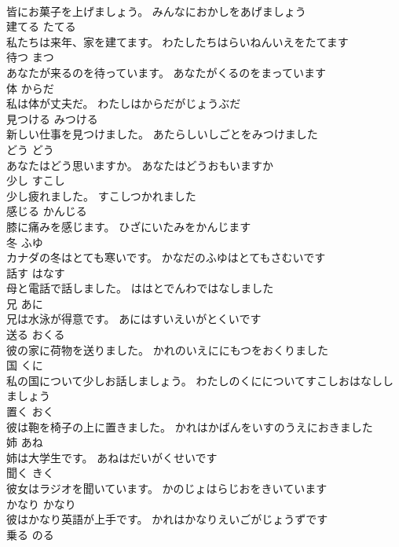 \documentclass[8pt]{extreport}
\begin{document}
\begin{CJK}{UTF8}{min}
\\	皆にお菓子を上げましょう。	みんなにおかしをあげましょう	
\\	建てる	たてる	
\\	私たちは来年、家を建てます。	わたしたちはらいねんいえをたてます	
\\	待つ	まつ	
\\	あなたが来るのを待っています。	あなたがくるのをまっています	
\\	体	からだ	
\\	私は体が丈夫だ。	わたしはからだがじょうぶだ	
\\	見つける	みつける	
\\	新しい仕事を見つけました。	あたらしいしごとをみつけました	
\\	どう	どう	
\\	あなたはどう思いますか。	あなたはどうおもいますか	
\\	少し	すこし	
\\	少し疲れました。	すこしつかれました	
\\	感じる	かんじる	
\\	膝に痛みを感じます。	ひざにいたみをかんじます	
\\	冬	ふゆ	
\\	カナダの冬はとても寒いです。	かなだのふゆはとてもさむいです	
\\	話す	はなす	
\\	母と電話で話しました。	ははとでんわではなしました	
\\	兄	あに	
\\	兄は水泳が得意です。	あにはすいえいがとくいです	
\\	送る	おくる	
\\	彼の家に荷物を送りました。	かれのいえににもつをおくりました	
\\	国	くに	
\\	私の国について少しお話しましょう。	わたしのくにについてすこしおはなししましょう	
\\	置く	おく	
\\	彼は鞄を椅子の上に置きました。	かれはかばんをいすのうえにおきました	
\\	姉	あね	
\\	姉は大学生です。	あねはだいがくせいです	
\\	聞く	きく	
\\	彼女はラジオを聞いています。	かのじょはらじおをきいています	
\\	かなり	かなり	
\\	彼はかなり英語が上手です。	かれはかなりえいごがじょうずです	
\\	乗る	のる	

\end{CJK}
\end{document}

